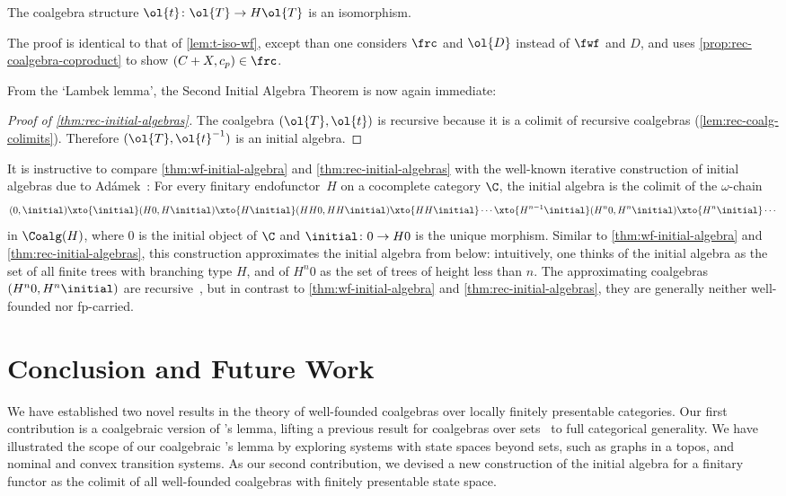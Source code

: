 \begin{lemma}\label{lem:t-iso}
The coalgebra structure $\ol{t}\colon \ol{T}\to H\ol{T}$ is an isomorphism.
\end{lemma}
The proof is identical to that of \autoref{lem:t-iso-wf}, except than one considers $\frc$ and $\ol{D}$ instead of $\fwf$ and $D$, and uses \autoref{prop:rec-coalgebra-coproduct} to show $(C+X,c_p)\in \frc$. 

From the `Lambek lemma', the Second Initial Algebra Theorem is now again immediate:

\begin{proof}[Proof of \autoref{thm:rec-initial-algebras}]
The coalgebra $(\ol{T},\ol{t})$ is recursive because it is a colimit of recursive coalgebras (\autoref{lem:rec-coalg-colimits}). Therefore $(\ol{T},\ol{t}^{-1})$ is an initial algebra.
\end{proof}

\begin{rem}
It is instructive to compare \autoref{thm:wf-initial-algebra} and \ref{thm:rec-initial-algebras} with the well-known iterative construction of initial algebras due to  Ad\'amek~\cite{adamek74}:
For every finitary endofunctor~$H$ on a cocomplete category $\C$, the initial algebra is the colimit of the $\omega$-chain
\[
(0,\initial)\xto{\smash{\initial}}
(H0,H\initial)\xto{\smash{H\initial}}
(HH0,HH\initial) \xto{\smash{HH\initial}}
\cdots \xto{\smash{H^{n-1}\initial}} 
(H^n0,H^n\initial)\xto{\smash{H^n\initial}} \cdots 
\]
in $\Coalg(H)$, where $0$ is the initial object of $\C$ and $\initial\colon 0\to H0$ is the unique morphism. Similar to \autoref{thm:wf-initial-algebra} and \ref{thm:rec-initial-algebras}, this construction approximates the initial algebra from below: intuitively, one thinks of the initial algebra as the set of all finite trees with branching type $H$, and of $H^n 0$ as the set of trees of height less than $n$. The approximating coalgebras $(H^n0,H^n\initial)$ are recursive~\cite[Prop.~6]{cuv06}, but in contrast to \autoref{thm:wf-initial-algebra} and \ref{thm:rec-initial-algebras}, they are generally neither well-founded nor fp-carried.
\end{rem}


\section{Conclusion and Future Work}
We have established two novel results in the theory of well-founded coalgebras over locally finitely presentable categories. Our first contribution is a coalgebraic version of \Konig's lemma, lifting a previous result for coalgebras over sets~\cite{amm25} to full categorical generality. We have illustrated the scope of our coalgebraic \Konig's lemma by exploring systems with state spaces beyond sets, such as graphs in a topos, and nominal and convex transition systems. As our second contribution, we devised a new construction of the initial algebra for a finitary functor as the colimit of all well-founded coalgebras with finitely presentable state space. 

